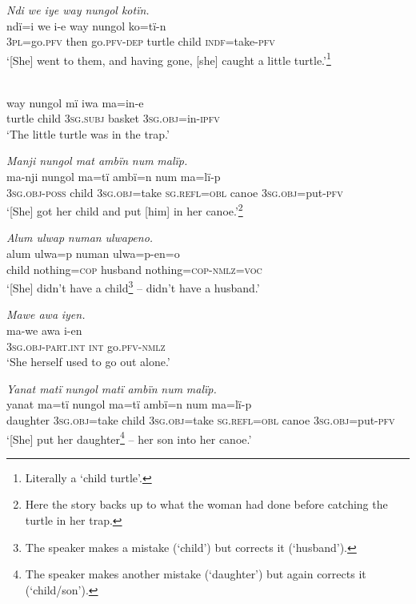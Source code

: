 \ex \textit{Ndi we i}{\textit{y}}\textit{e way nungol kotïn.}\\
\gll ndï={i} we    i-e        way  nungol  ko{=}tï{{}-}n\\
3\textsc{pl}={go.}\textsc{pfv}  {then} go.\textsc{pfv-dep}  turtle  child  \textsc{indf=}take-\textsc{pfv}\\
\glt ‘[She] went to them, and having gone, [she] caught a little tur{t}le.’\footnote{Literally a ‘child turtle’.}

\newpage

\\
\gll way  nungol  mï       iwa      m{a=i}n{{}-}e\\
turtle  child  3\textsc{sg.subj}  basket  3\textsc{sg.obj}=in-\textsc{ipfv}\\
\glt ‘The little turtle was in the trap.’

\ex \textit{Manji nungol mat ambïn} {\textit{nu}}\textit{m} {\textit{malï}}\textit{p.}\\
\gll ma-nji      nungol  ma{=}tï      ambï=n num  ma=lï-p\\
3\textsc{sg.obj-poss}  child  3\textsc{sg.obj}=take  \textsc{sg.refl=obl}  canoe  3\textsc{sg.obj}=put-\textsc{pfv}\\
\glt ‘[She] got her child and put [him] in her canoe.’\footnote{Here the story backs up to what the woman had done before catching the turtle in her trap.}

\ex \textit{Alum ulwap} {\textit{numan}} \textit{ulwape}{\textit{no.}}\\
\gll alum  ulwa=p    numan ulwa{=}p{{}-}e{n=o}\\
child  nothing=\textsc{cop}  husband  nothing=\textsc{cop}{}-\textsc{nmlz=voc}\\
\glt ‘[She] didn’t have a child\footnote{The speaker makes a mistake (‘child’) but corrects it (‘husband’).} – didn’t have a husband.’

\ex \textit{Mawe aw}{\textit{a}} \textit{iyen.}\\
\gll ma-we        aw{a} i-e{n}\\
3\textsc{sg.obj-part.int}  \textsc{int}    go.\textsc{pfv-nmlz}\\
\glt ‘She herself used to go out alone.’

\ex \textit{Yanat matï} \textit{nungol matï ambïn} {\textit{n}}\textit{um} {\textit{ma}}\textit{l}{\textit{ï}}\textit{p.}\\
\gll yanat    ma=tï      nungol  ma{=}tï      ambï=n {n}um {ma=}l{ï-}p\\
daughter  3\textsc{sg.obj}=take  child  3\textsc{sg.obj}=take  \textsc{sg.refl=obl}  canoe 3\textsc{sg.obj}=put-\textsc{pfv}\\
\glt ‘[She] put her daughter\footnote{The speaker makes another mistake (‘daughter’) but again corrects it (‘child/son’).} -- her son into her canoe.’

